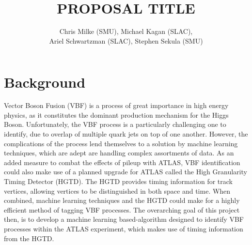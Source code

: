 \documentclass[12pt,letterpaper]{article}
\begin{document}
\pagestyle{fancy}


\pagestyle{plain}
\label{sec:coverpaqe}




\title{{\large PROPOSAL TITLE}}

\author{Chris Milke (SMU), Michael Kagan (SLAC),\\
  Ariel Schwartzman (SLAC), Stephen Sekula (SMU)}


\date{}

\maketitle

\newpage


\section*{Background}
    Vector Boson Fusion (VBF) is a process of great importance in high energy physics, as it constitutes the dominant production mechanism for the Higgs Boson. Unfortunately, the VBF process is a particularly challenging one to identify, due to overlap of multiple quark jets on top of one another. However, the complications of the process lend themselves to a solution by machine learning techniques, which are adept are handling complex assortments of data. As an added measure to combat the effects of pileup with ATLAS, VBF identification could also make use of a planned upgrade for ATLAS called the High Granularity Timing Detector (HGTD). The HGTD provides timing information for track vertices, allowing vertices to be distinguished in both space and time. When combined, machine learning techniques and the HGTD could make for a highly efficient method of tagging VBF processes. The overarching goal of this project then, is to develop a machine learning based-algorithm designed to identify VBF processes within the ATLAS experiment, which makes use of timing information from the HGTD.



\end{document}

